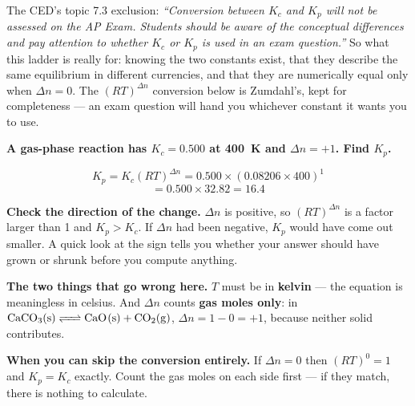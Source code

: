 \documentclass{apchem-worksheet}
\begin{document}
\begin{center}
\end{center}

\begin{apcnote}
The CED's topic 7.3 exclusion: \emph{``Conversion between $K_{c}$ and
$K_{p}$ will not be assessed on the AP Exam. Students should be aware
of the conceptual differences and pay attention to whether $K_{c}$ or
$K_{p}$ is used in an exam question.''} So what this ladder is really
for: knowing the two constants exist, that they describe the same
equilibrium in different currencies, and that they are numerically
equal only when $\Delta n = 0$. The $(RT)^{\Delta n}$ conversion below
is Zumdahl's, kept for completeness --- an exam question will hand you
whichever constant it wants you to use.
\end{apcnote}

\begin{workedexample}
\textbf{A gas-phase reaction has $K_{c} = 0.500$ at \SI{400}{\kelvin}
and $\Delta n = +1$. Find $K_{p}$.}

\[ K_{p} = K_{c}(RT)^{\Delta n}
         = 0.500 \times (0.08206 \times 400)^{1} \]
\[ = 0.500 \times 32.82 = \mathbf{16.4} \]

\textbf{Check the direction of the change.} $\Delta n$ is positive, so
$(RT)^{\Delta n}$ is a factor larger than 1 and $K_{p} > K_{c}$. If
$\Delta n$ had been negative, $K_{p}$ would have come out smaller. A
quick look at the sign tells you whether your answer should have grown
or shrunk before you compute anything.

\textbf{The two things that go wrong here.} $T$ must be in
\textbf{kelvin} --- the equation is meaningless in celsius. And
$\Delta n$ counts \textbf{gas moles only}: in
$\ce{CaCO3(s) <=> CaO(s) + CO2(g)}$, $\Delta n = 1 - 0 = +1$, because
neither solid contributes.

\textbf{When you can skip the conversion entirely.} If $\Delta n = 0$
then $(RT)^{0} = 1$ and $K_{p} = K_{c}$ exactly. Count the gas moles on
each side first --- if they match, there is nothing to calculate.
\end{workedexample}
\end{document}
